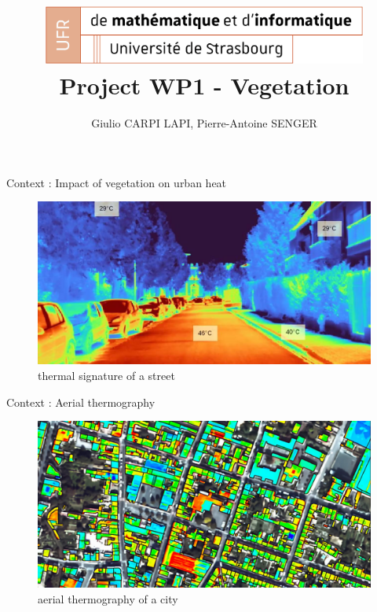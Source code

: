 \documentclass[10pt]{beamer}
\title[exMA WP1 Vegetation]{
  \includegraphics[width=0.8\textwidth]{images/logo_Uni.png}
  Project WP1 - Vegetation}
\author[PA-Giulio]{Giulio CARPI LAPI, Pierre-Antoine SENGER}
\begin{document}
\frame{\titlepage}

\begin{frame}{Context : Impact of vegetation on urban heat}
  \begin{figure}[h] %
    \centering
    \includegraphics[width=1\textwidth]{images/heat_street.png}
    \caption{thermal signature of a street\cite{img:street_thermography}} %
    \label{fig:heat_street} %
  \end{figure}
\end{frame}

\begin{frame}{Context : Aerial thermography}
  \begin{figure}[h] %
    \centering
    \includegraphics[width=1\textwidth]{images/thermographie-aerienne.jpg}
    \caption{aerial thermography of a city\cite{img:aerialview}} %
    \label{fig:thermographie} %
  \end{figure}
\end{frame}
\end{document}
